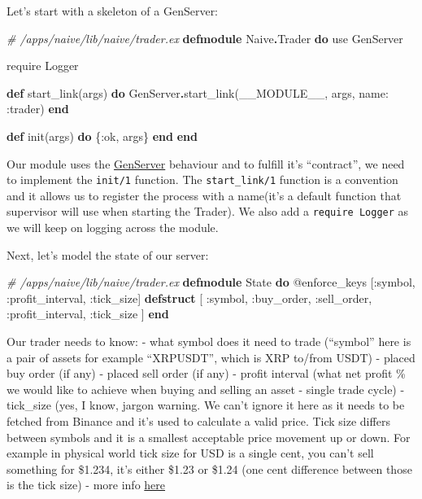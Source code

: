 \documentclass[
]{book}
\newenvironment{Shaded}{\begin{snugshade}}{\end{snugshade}}
\newcommand{\CommentTok}[1]{\textcolor[rgb]{0.56,0.35,0.01}{\textit{#1}}}
\newcommand{\ConstantTok}[1]{\textcolor[rgb]{0.00,0.00,0.00}{#1}}
\newcommand{\ImportTok}[1]{#1}
\newcommand{\KeywordTok}[1]{\textcolor[rgb]{0.13,0.29,0.53}{\textbf{#1}}}
\newcommand{\NormalTok}[1]{#1}
\newcommand{\OperatorTok}[1]{\textcolor[rgb]{0.81,0.36,0.00}{\textbf{#1}}}
\newcommand{\OtherTok}[1]{\textcolor[rgb]{0.56,0.35,0.01}{#1}}
\newcommand{\VariableTok}[1]{\textcolor[rgb]{0.00,0.00,0.00}{#1}}
\begin{document}
Let's start with a skeleton of a GenServer:

\begin{Shaded}
\begin{Highlighting}[]
\CommentTok{\# /apps/naive/lib/naive/trader.ex}
\KeywordTok{defmodule} \ConstantTok{Naive}\OperatorTok{.}\ConstantTok{Trader} \KeywordTok{do}
  \ImportTok{use} \ConstantTok{GenServer}
  
  \ImportTok{require} \ConstantTok{Logger}

  \KeywordTok{def}\NormalTok{ start\_link(args) }\KeywordTok{do}
    \ConstantTok{GenServer}\OperatorTok{.}\NormalTok{start\_link(}\ConstantTok{\_\_MODULE\_\_}\NormalTok{, args, }\VariableTok{name:} \VariableTok{:trader}\NormalTok{)}
  \KeywordTok{end}

  \KeywordTok{def}\NormalTok{ init(args) }\KeywordTok{do}
\NormalTok{    \{}\VariableTok{:ok}\NormalTok{, args\}}
  \KeywordTok{end}
\KeywordTok{end}
\end{Highlighting}
\end{Shaded}

Our module uses the \href{https://hexdocs.pm/elixir/master/GenServer.html\#content}{GenServer} behaviour and to fulfill it's ``contract'', we need to implement the \texttt{init/1} function. The \texttt{start\_link/1} function is a convention and it allows us to register the process with a name(it's a default function that supervisor will use when starting the Trader). We also add a \texttt{require\ Logger} as we will keep on logging across the module.

Next, let's model the state of our server:

\begin{Shaded}
\begin{Highlighting}[]
  \CommentTok{\# /apps/naive/lib/naive/trader.ex}
  \KeywordTok{defmodule} \ConstantTok{State} \KeywordTok{do}
    \OtherTok{@enforce\_keys}\NormalTok{ [}\VariableTok{:symbol}\NormalTok{, }\VariableTok{:profit\_interval}\NormalTok{, }\VariableTok{:tick\_size}\NormalTok{]}
    \KeywordTok{defstruct}\NormalTok{ [}
      \VariableTok{:symbol}\NormalTok{,}
      \VariableTok{:buy\_order}\NormalTok{,}
      \VariableTok{:sell\_order}\NormalTok{,}
      \VariableTok{:profit\_interval}\NormalTok{,}
      \VariableTok{:tick\_size}
\NormalTok{    ]}
  \KeywordTok{end}
\end{Highlighting}
\end{Shaded}

Our trader needs to know:
- what symbol does it need to trade (``symbol'' here is a pair of assets for example ``XRPUSDT'', which is XRP to/from USDT)
- placed buy order (if any)
- placed sell order (if any)
- profit interval (what net profit \% we would like to achieve when buying and selling an asset - single trade cycle)
- tick\_size (yes, I know, jargon warning. We can't ignore it here as it needs to be fetched from Binance and it's used to calculate a valid price. Tick size differs between symbols and it is a smallest acceptable price movement up or down. For example in physical world tick size for USD is a single cent, you can't sell something for \$1.234, it's either \$1.23 or \$1.24 (one cent difference between those is the tick size) - more info \href{https://www.investopedia.com/terms/t/tick.asp}{here}
\end{document}
